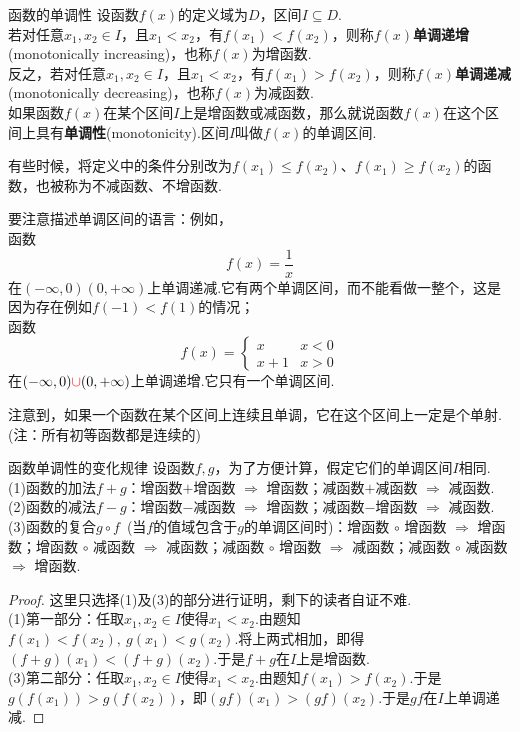 \documentclass[lang=cn, zihao=5]{elegantbook}
\begin{document}
\begin{definition}{函数的单调性} %
    设函数$f(x)$的定义域为$D$，区间$I \subseteq D$.\\
    若对任意$x_1,x_2 \in I$，且$x_1 < x_2$，有$f(x_1) < f(x_2)$，则称$f(x)$\textbf{单调递增}(monotonically increasing)，也称$f(x)$为增函数.\\
    反之，若对任意$x_1,x_2 \in I$，且$x_1 < x_2$，有$f(x_1) > f(x_2)$，则称$f(x)$\textbf{单调递减}(monotonically decreasing)，也称$f(x)$为减函数.\\
    如果函数$f(x)$在某个区间$I$上是增函数或减函数，那么就说函数$f(x)$在这个区间上具有\textbf{单调性}(monotonicity).区间$I$叫做$f(x)$的单调区间.
\end{definition}
\begin{remark}
    有些时候，将定义中的条件分别改为$f(x_1) \leq f(x_2)$、$f(x_1) \geq f(x_2)$的函数，也被称为不减函数、不增函数.
\end{remark}
\begin{note}
    要注意描述单调区间的语言：例如，\\
    函数$$f(x)=\frac{1}{x}$$
    在$(- \infty , 0)$\color{red}{和}\color{black}$(0 , + \infty)$上单调递减.它有两个单调区间，而不能看做一整个，这是因为存在例如$f(-1) < f(1)$的情况；\\
    函数$$ f(x)=\begin{cases}
    	x &x<0 \\
    	x+1 &x>0
    \end{cases}$$
    在$(- \infty , 0) \color{red}{\cup}\color{black} (0 , + \infty)$上单调递增.它只有一个单调区间.
\end{note}

注意到，如果一个函数在某个区间上连续且单调，它在这个区间上一定是个单射.(注：所有初等函数都是连续的)

\begin{proposition}{函数单调性的变化规律}
    设函数$f,g$，为了方便计算，假定它们的单调区间$I$相同.\\
    (1)函数的加法$f+g$：增函数$+$增函数 $\Rightarrow$ 增函数；减函数$+$减函数 $\Rightarrow$ 减函数.\\
    (2)函数的减法$f-g$：增函数$-$减函数 $\Rightarrow$ 增函数；减函数$-$增函数 $\Rightarrow$ 减函数.\\
    (3)函数的复合$g \circ f$~(当$f$的值域包含于$g$的单调区间时)：增函数 $\circ$ 增函数 $\Rightarrow$ 增函数；增函数 $\circ$ 减函数 $\Rightarrow$ 减函数；减函数 $\circ$ 增函数 $\Rightarrow$ 减函数；减函数 $\circ$ 减函数 $\Rightarrow$ 增函数.
\end{proposition}
\begin{proof}
    这里只选择(1)及(3)的部分进行证明，剩下的读者自证不难. \\
    (1)第一部分：任取$x_1,x_2 \in I$使得$x_1 < x_2$.由题知$f(x_1) < f(x_2),~g(x_1) < g(x_2)$.将上两式相加，即得$(f+g)(x_1) < (f+g)(x_2)$.于是$f+g$在$I$上是增函数. \\
    (3)第二部分：任取$x_1,x_2 \in I$使得$x_1 < x_2$.由题知$f(x_1) > f(x_2)$.于是$g(f(x_1)) > g(f(x_2))$，即$(gf)(x_1) > (gf)(x_2)$.于是$gf$在$I$上单调递减.
\end{proof}
\end{document}

